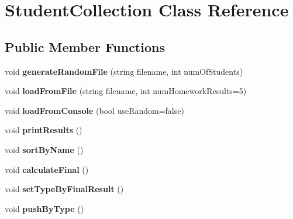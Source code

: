 \hypertarget{class_student_collection}{}\section{Student\+Collection Class Reference}
\label{class_student_collection}
\subsection*{Public Member Functions}
\begin{DoxyCompactItemize}
\item 
\mbox{\label{class_student_collection_abdc802a5e7b06c936a1a5785981a7a9c}} 
void {\bfseries generate\+Random\+File} (string filename, int num\+Of\+Students)
\item 
\mbox{\label{class_student_collection_a51b080e8d863fef553a3bf93764fdd5b}} 
void {\bfseries load\+From\+File} (string filename, int num\+Homework\+Results=5)
\item 
\mbox{\label{class_student_collection_a56c3116acb4de7e8b3e7cb4c4e37fa54}} 
void {\bfseries load\+From\+Console} (bool use\+Random=false)
\item 
\mbox{\label{class_student_collection_a875385322e5a66541aad2de94f51b7fe}} 
void {\bfseries print\+Results} ()
\item 
\mbox{\label{class_student_collection_ae775959d9f4927575e40c375ce88c2d2}} 
void {\bfseries sort\+By\+Name} ()
\item 
\mbox{\label{class_student_collection_aebfeafaa074b1c741fcc941f20d3235c}} 
void {\bfseries calculate\+Final} ()
\item 
\mbox{\label{class_student_collection_a106bfb04e98804f700c9ac81b6ce6808}} 
void {\bfseries set\+Type\+By\+Final\+Result} ()
\item 
\mbox{\label{class_student_collection_a6758350c512e34009f008aebd1017f84}} 
void {\bfseries push\+By\+Type} ()
\item 

\end{DoxyCompactItemize}
